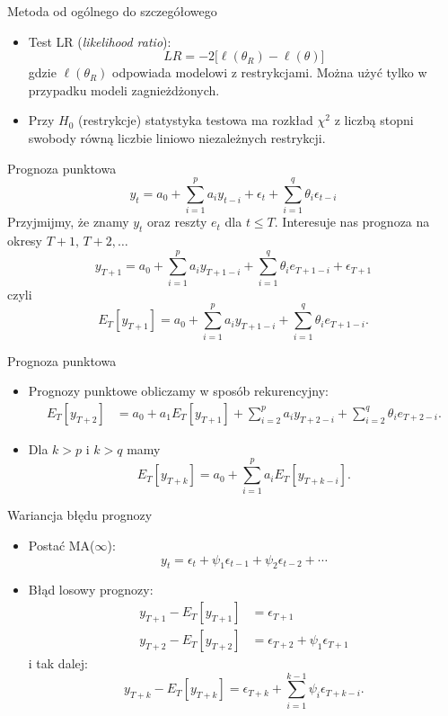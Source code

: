 \documentclass[11pt,usenames,dvipsnames,aspectratio=169]{beamer}
\begin{document}
\begin{frame}{Metoda od ogólnego do szczegółowego}
\begin{itemize}
    \item Test LR (\emph{likelihood ratio}):
    \[
    LR=-2\big[\ell(\theta_{R})-\ell(\theta)\big]
    \]
    gdzie $\ell(\theta_{R})$ odpowiada modelowi z restrykcjami. Można użyć tylko w przypadku modeli zagnieżdżonych.
    \item Przy $H_{0}$ (restrykcje) statystyka testowa ma rozkład $\chi^{2}$ z liczbą stopni swobody równą liczbie liniowo niezależnych restrykcji.
\end{itemize}
\end{frame}

\begin{frame}{Prognoza punktowa}
\[
y_{t}=a_{0}+\sum_{i=1}^{p}a_{i}y_{t-i}+\epsilon_{t}+\sum_{i=1}^{q}\theta_{i}\epsilon_{t-i}
\]
Przyjmijmy, że znamy $y_{t}$ oraz reszty $e_{t}$ dla $t\leq T$. Interesuje nas prognoza na okresy $T+1,\,T+2,\ldots$
\[
y_{T+1}=a_{0}+\sum_{i=1}^{p}a_{i}y_{T+1-i}+\sum_{i=1}^{q}\theta_{i}e_{T+1-i}+\epsilon_{T+1}
\]
czyli
\[
E_{T}[y_{T+1}]=a_{0}+\sum_{i=1}^{p}a_{i}y_{T+1-i}+\sum_{i=1}^{q}\theta_{i}e_{T+1-i}.
\]
\end{frame}

\begin{frame}{Prognoza punktowa}
\begin{itemize}
    \item Prognozy punktowe obliczamy w sposób rekurencyjny:
    \begin{align*}
    E_{T}[y_{T+2}] & =a_{0}+a_{1}E_{T}[y_{T+1}]+\sum_{i=2}^{p}a_{i}y_{T+2-i}+\sum_{i=2}^{q}\theta_{i}e_{T+2-i}.
    \end{align*}
    \item Dla $k>p$ i $k>q$ mamy
    \[
    E_{T}[y_{T+k}]=a_{0}+\sum_{i=1}^{p}a_{i}E_{T}[y_{T+k-i}].
    \]
\end{itemize}
\end{frame}

\begin{frame}{Wariancja błędu prognozy}
\begin{itemize}
    \item Postać MA($\infty$):
    \[
    y_{t}=\epsilon_{t}+\psi_{1}\epsilon_{t-1}+\psi_{2}\epsilon_{t-2}+\cdots
    \]
    \item Błąd losowy prognozy:
    \begin{align*}
    y_{T+1}-E_{T}[y_{T+1}] & =\epsilon_{T+1}\\
    y_{T+2}-E_{T}[y_{T+2}] & =\epsilon_{T+2}+\psi_{1}\epsilon_{T+1}
    \end{align*}
    i tak dalej:
    \[
    y_{T+k}-E_{T}[y_{T+k}]=\epsilon_{T+k}+\sum_{i=1}^{k-1}\psi_{i}\epsilon_{T+k-i}.
    \]
\end{itemize}
\end{frame}
\end{document}
